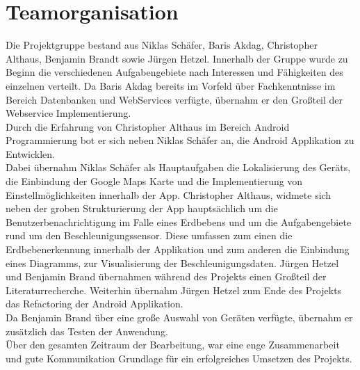 \section{Teamorganisation}
Die Projektgruppe bestand aus Niklas Schäfer, Baris Akdag, Christopher Althaus, Benjamin Brandt sowie Jürgen Hetzel. Innerhalb der Gruppe wurde zu Beginn die verschiedenen Aufgabengebiete nach Interessen und Fähigkeiten des einzelnen verteilt.
Da Baris Akdag bereits im Vorfeld über Fachkenntnisse im Bereich Datenbanken und WebServices verfügte, übernahm er den Großteil der Webservice Implementierung.\\
Durch die Erfahrung von Christopher Althaus im Bereich Android Programmierung bot er sich neben Niklas Schäfer an, die Android Applikation zu Entwicklen.\\
Dabei übernahm Niklas Schäfer als Hauptaufgaben die Lokalisierung des Geräts, die Einbindung der Google Maps Karte und die Implementierung von Einstellmöglichkeiten innerhalb der App. Christopher Althaus, widmete sich neben der groben Strukturierung der App hauptsächlich um die Benutzerbenachrichtigung im Falle eines Erdbebens und um die Aufgabengebiete rund um den Beschleunigungssensor. Diese umfassen zum einen die Erdbebenerkennung innerhalb der Applikation und zum anderen die Einbindung eines Diagramms, zur Visualisierung der Beschleunigungsdaten.
Jürgen Hetzel und Benjamin Brand übernahmen während des Projekts einen Großteil der Literaturrecherche. Weiterhin übernahm Jürgen Hetzel zum Ende des Projekts das Refactoring der Android Applikation.\\
Da Benjamin Brand über eine große Auswahl von Geräten verfügte, übernahm er zusätzlich das Testen der Anwendung.\\
Über den gesamten Zeitraum der Bearbeitung, war eine enge Zusammenarbeit und gute Kommunikation Grundlage für ein erfolgreiches Umsetzen des Projekts.
\newpage